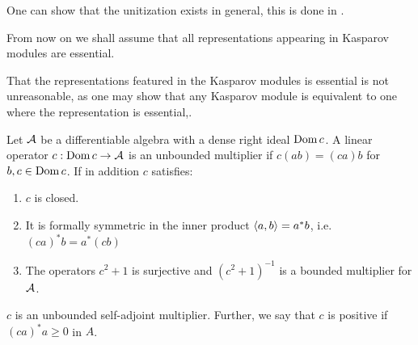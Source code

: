 One can show that the unitization exists in general, this is done in \cite{meyer}.  
\begin{assumption}
	From now on we shall assume that all representations appearing in Kasparov modules are essential. 
\end{assumption}
\begin{remark}
	That the representations featured in the Kasparov modules is essential is not unreasonable, as one may show that any Kasparov module is equivalent to one where the representation is essential,\cite{kasparov}. 
\end{remark}
\begin{definition}
	Let $\mathcal{A}$ be a differentiable algebra with a dense right ideal $\operatorname{Dom} c$. A linear operator $c:\operatorname{Dom} c\to \mathcal{A}$ is an unbounded multiplier if $c(ab)=(ca)b$ for $b,c\in \operatorname{Dom} c$. If in addition $c$ satisfies:
	\begin{enumerate}
	\item
		$c$ is closed.
	\item
		It is formally symmetric in the inner product $\left \langle a,b \right \rangle=a^*b$, i.e. $(ca)^*b=a^*(cb)$ 
	\item
		The operators $c^2+1$ is surjective and $(c^2+1)^{-1}$ is a bounded multiplier for $\mathcal{A}$. 
	\end{enumerate}
	$c$ is an unbounded self-adjoint multiplier.  
	Further, we say that $c$ is positive if $(ca)^*a\geq 0$ in $A$. 
\end{definition}

